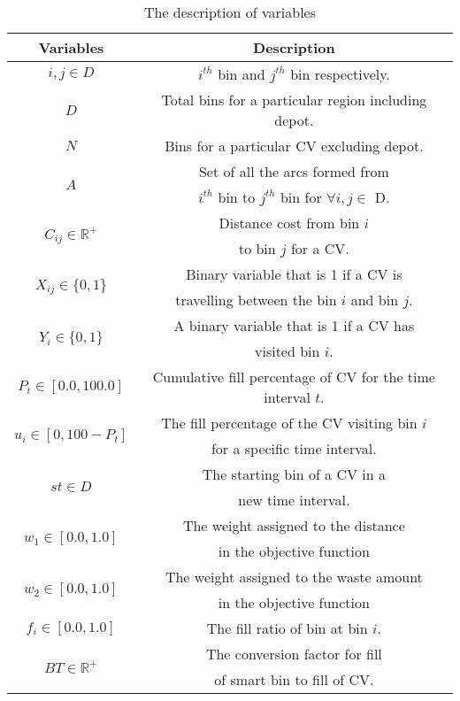 \documentclass[12pt]{article}
\begin{document}
\begin{table}[H]\label{variables}
	\centering
	\caption{The description of variables}
	\begin{tabular}{|c|c|}
        \hline 
        \rowcolor{Gray1}\hspace{40pt} \textbf{Variables} \hspace{40pt} & \hspace{130pt} \textbf{Description} \hspace{130pt} \\
		\hline $i, j \in D$ & $i^{th}$ bin and $j^{th}$ bin respectively.\\
		\hline $D$ & Total bins for a particular region including depot.\\
		\hline $N$ & Bins for a particular CV excluding depot.\\
		\hline \multirow{2}{*}{$A$} & Set of all the arcs formed from \\
		&  $i^{th}$ bin to $j^{th}$ bin for $\forall i ,j \in$ D.\\
		\hline \multirow{2}{*}{$C_{ij}\in \mathbb{R}^+$} & Distance cost from bin $i$\\
		& to bin $j$ for a CV.\\
		\hline \multirow{2}{*}{$X_{ij} \in \{0, 1\}$} & Binary variable that is 1 if a CV is\\
		& travelling between the bin $i$ and bin $j$.\\  
		\hline \multirow{2}{*}{$Y_{i} \in \{0, 1\}$} & A binary variable that is 1 if a CV has \\
		& visited bin $i$.\\
		\hline \multirow{1}{*}{$P_{t} \in [0.0, 100.0]$} & Cumulative fill percentage of CV for the time interval $t$.\\
		\hline \multirow{2}{*}{$u_{i}  \in [0, 100 -P_{t}] $} & The fill percentage of the CV visiting bin $i$ \\
		& for a specific time interval.\\
		\hline \multirow{2}{*}{$st \in D$} & The starting bin of a CV in a\\
		& new time interval.\\
		\hline \multirow{2}{*}{$w_{1} \in [0.0, 1.0]$} & The weight assigned to the distance \\
		& in the objective function\\
		\hline \multirow{2}{*}{$w_{2} \in [0.0, 1.0]$} & The weight assigned to the waste amount \\
		& in the objective function\\
		\hline \multirow{1}{*}{$f_{i} \in [0.0, 1.0]$} & The fill ratio of bin at bin $i$.\\
		\hline \multirow{2}{*}{$BT \in \mathbb{R}^+$} & The conversion factor for fill \\
		& of smart bin to fill of CV.\\
		
		\hline
    \end{tabular}
\end{table} 
\end{document}
